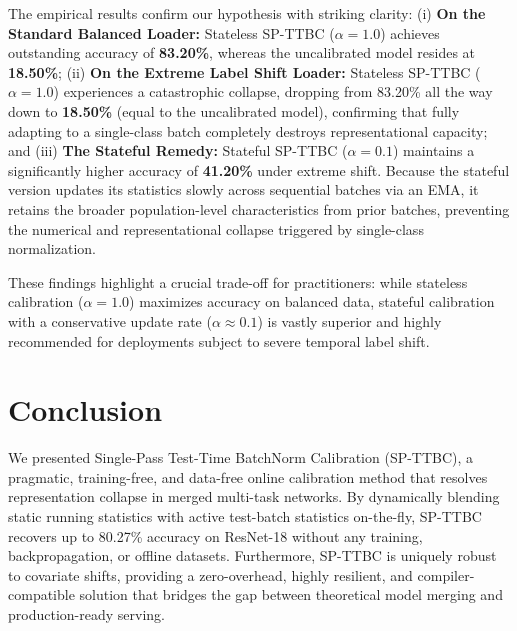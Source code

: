 \documentclass{article}
\theoremstyle{plain}
\theoremstyle{definition}
\theoremstyle{remark}
\begin{document}
The empirical results confirm our hypothesis with striking clarity: (i) \textbf{On the Standard Balanced Loader:} Stateless SP-TTBC ($\alpha=1.0$) achieves outstanding accuracy of \textbf{83.20\%}, whereas the uncalibrated model resides at \textbf{18.50\%}; (ii) \textbf{On the Extreme Label Shift Loader:} Stateless SP-TTBC ($\alpha=1.0$) experiences a catastrophic collapse, dropping from 83.20\% all the way down to \textbf{18.50\%} (equal to the uncalibrated model), confirming that fully adapting to a single-class batch completely destroys representational capacity; and (iii) \textbf{The Stateful Remedy:} Stateful SP-TTBC ($\alpha=0.1$) maintains a significantly higher accuracy of \textbf{41.20\%} under extreme shift. Because the stateful version updates its statistics slowly across sequential batches via an EMA, it retains the broader population-level characteristics from prior batches, preventing the numerical and representational collapse triggered by single-class normalization.

These findings highlight a crucial trade-off for practitioners: while stateless calibration ($\alpha=1.0$) maximizes accuracy on balanced data, stateful calibration with a conservative update rate ($\alpha \approx 0.1$) is vastly superior and highly recommended for deployments subject to severe temporal label shift.

\vspace{-5pt}
\section{Conclusion}
\label{conclusion}
\vspace{-4pt}
We presented Single-Pass Test-Time BatchNorm Calibration (SP-TTBC), a pragmatic, training-free, and data-free online calibration method that resolves representation collapse in merged multi-task networks. By dynamically blending static running statistics with active test-batch statistics on-the-fly, SP-TTBC recovers up to 80.27\% accuracy on ResNet-18 without any training, backpropagation, or offline datasets. Furthermore, SP-TTBC is uniquely robust to covariate shifts, providing a zero-overhead, highly resilient, and compiler-compatible solution that bridges the gap between theoretical model merging and production-ready serving.



\end{document}

